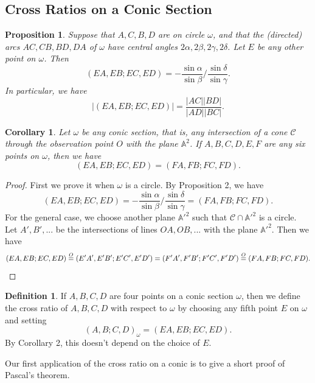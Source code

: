 \documentclass[letterpaper,11pt]{article}
\newtheorem{cor}{Corollary}
\newtheorem{prop}{Proposition}
\theoremstyle{definition}
\newtheorem{defn}{Definition}
\theoremstyle{remark}
\begin{document}
\subsection{Cross Ratios on a Conic Section}

\begin{prop} Suppose that $A,C,B,D$ are on circle $\omega$, and that the (directed) arcs $AC,CB,BD,DA$ of $\omega$ have central angles $2\alpha,2\beta,2\gamma,2\delta$. Let $E$ be any other point on $\omega$. Then
\[
(EA,EB;EC,ED) = -\frac{\sin \alpha}{\sin \beta}\bigg/\frac{\sin \delta}{\sin \gamma}.
\]
In particular, we have
\[
|(EA,EB;EC,ED)| = \frac{|AC||BD|}{|AD||BC|}.
\]
\end{prop}

\begin{cor} Let $\omega$ be any \emph{conic section}, that is, any intersection of a cone $\mathcal{C}$ through the observation point $O$ with the plane $\mathbb{A}^2$. If $A,B,C,D,E,F$ are any six points on $\omega$, then we have
\[
(EA,EB;EC,ED) = (FA,FB;FC,FD).
\]
\end{cor}
\begin{proof} First we prove it when $\omega$ is a circle. By Proposition 2, we have
\[
(EA,EB;EC,ED) = -\frac{\sin \alpha}{\sin \beta}\bigg/\frac{\sin \delta}{\sin \gamma} = (FA,FB;FC,FD).
\]
For the general case, we choose another plane $\mathbb{A'}^2$ such that $\mathcal{C}\cap\mathbb{A'}^2$ is a circle. Let $A',B',...$ be the intersections of lines $OA,OB, ...$ with the plane $\mathbb{A'}^2$. Then we have
\[
(EA,EB;EC,ED) \stackrel{O}{=} (E'A',E'B';E'C',E'D') = (F'A',F'B';F'C',F'D') \stackrel{O}{=} (FA,FB;FC,FD).\qedhere
\]
\end{proof}

\begin{defn} If $A,B,C,D$ are four points on a conic section $\omega$, then we define the cross ratio of $A,B,C,D$ with respect to $\omega$ by choosing any fifth point $E$ on $\omega$ and setting
\[
(A,B;C,D)_{\omega} = (EA,EB;EC,ED).
\]
By Corollary 2, this doesn't depend on the choice of $E$.
\end{defn}

Our first application of the cross ratio on a conic is to give a short proof of Pascal's theorem.
\end{document}
